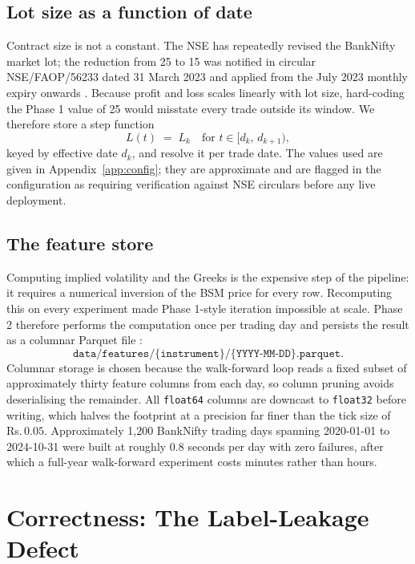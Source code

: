 \documentclass[11pt,a4paper]{article}
\newcommand{\rs}{Rs.\,}                 %
\newcommand{\code}[1]{\texttt{#1}}
\begin{document}
\subsection{Lot size as a function of date}

Contract size is not a constant. The NSE has repeatedly revised the BankNifty market
lot; the reduction from 25 to 15 was notified in circular NSE/FAOP/56233 dated
31 March 2023 and applied from the July 2023 monthly expiry onwards \cite{nsecircular}.
Because profit and loss scales linearly with lot size, hard-coding the Phase 1 value of
25 would misstate every trade outside its window. We therefore store a step function
\begin{equation}
L(t) \;=\; L_k \quad \text{for } t \in [d_k,\, d_{k+1}),
\end{equation}
keyed by effective date $d_k$, and resolve it per trade date. The values used are given
in Appendix~\ref{app:config}; they are approximate and are flagged in the configuration
as requiring verification against NSE circulars before any live deployment.

\subsection{The feature store}

Computing implied volatility and the Greeks is the expensive step of the pipeline: it
requires a numerical inversion of the BSM price for every row. Recomputing this on every
experiment made Phase 1-style iteration impossible at scale. Phase 2 therefore performs
the computation once per trading day and persists the result as a columnar Parquet file
\cite{parquet}:
\[
\code{data/features/\{instrument\}/\{YYYY-MM-DD\}.parquet}.
\]
Columnar storage is chosen because the walk-forward loop reads a fixed subset of
approximately thirty feature columns from each day, so column pruning avoids
deserialising the remainder. All \code{float64} columns are downcast to \code{float32}
before writing, which halves the footprint at a precision far finer than the tick size
of \rs$0.05$. Approximately 1{,}200 BankNifty trading days spanning 2020-01-01 to
2024-10-31 were built at roughly $0.8$ seconds per day with zero failures, after which a
full-year walk-forward experiment costs minutes rather than hours.

\section{Correctness: The Label-Leakage Defect}\label{sec:label}
\end{document}
